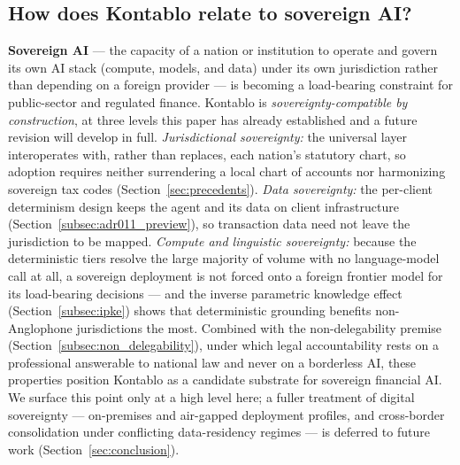 \subsection{How does Kontablo relate to sovereign AI?}
\label{subsec:sovereign_ai}
\textbf{Sovereign AI} --- the capacity of a nation or institution to operate and
govern its own AI stack (compute, models, and data) under its own jurisdiction
rather than depending on a foreign provider --- is becoming a load-bearing
constraint for public-sector and regulated finance. Kontablo is
\emph{sovereignty-compatible by construction}, at three levels this paper has
already established and a future revision will develop in full.
\emph{Jurisdictional sovereignty:} the universal layer interoperates with, rather
than replaces, each nation's statutory chart, so adoption requires neither
surrendering a local chart of accounts nor harmonizing sovereign tax codes
(Section~\ref{sec:precedents}). \emph{Data sovereignty:} the per-client
determinism design keeps the agent and its data on client infrastructure
(Section~\ref{subsec:adr011_preview}), so transaction data need not leave the
jurisdiction to be mapped. \emph{Compute and linguistic sovereignty:} because the
deterministic tiers resolve the large majority of volume with no language-model
call at all, a sovereign deployment is not forced onto a foreign frontier model
for its load-bearing decisions --- and the inverse parametric knowledge effect
(Section~\ref{subsec:ipke}) shows that deterministic grounding benefits
non-Anglophone jurisdictions the most. Combined with the non-delegability premise
(Section~\ref{subsec:non_delegability}), under which legal accountability rests on
a professional answerable to national law and never on a borderless AI, these
properties position Kontablo as a candidate substrate for sovereign financial AI.
We surface this point only at a high level here; a fuller treatment of digital
sovereignty --- on-premises and air-gapped deployment profiles, and cross-border
consolidation under conflicting data-residency regimes --- is deferred to future
work (Section~\ref{sec:conclusion}).
